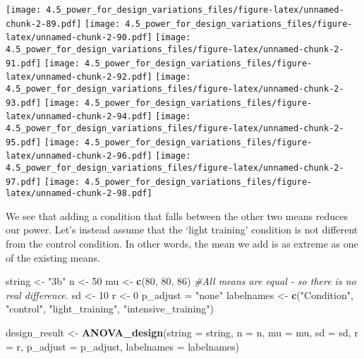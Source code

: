 \documentclass[]{article}
\newenvironment{Shaded}{\begin{snugshade}}{\end{snugshade}}
\newcommand{\KeywordTok}[1]{\textcolor[rgb]{0.13,0.29,0.53}{\textbf{#1}}}
\newcommand{\DataTypeTok}[1]{\textcolor[rgb]{0.13,0.29,0.53}{#1}}
\newcommand{\DecValTok}[1]{\textcolor[rgb]{0.00,0.00,0.81}{#1}}
\newcommand{\StringTok}[1]{\textcolor[rgb]{0.31,0.60,0.02}{#1}}
\newcommand{\CommentTok}[1]{\textcolor[rgb]{0.56,0.35,0.01}{\textit{#1}}}
\newcommand{\NormalTok}[1]{#1}
\begin{document}
\texttt{[image: 4.5\_power\_for\_design\_variations\_files/figure-latex/unnamed-chunk-2-89.pdf]}
\texttt{[image: 4.5\_power\_for\_design\_variations\_files/figure-latex/unnamed-chunk-2-90.pdf]}
\texttt{[image: 4.5\_power\_for\_design\_variations\_files/figure-latex/unnamed-chunk-2-91.pdf]}
\texttt{[image: 4.5\_power\_for\_design\_variations\_files/figure-latex/unnamed-chunk-2-92.pdf]}
\texttt{[image: 4.5\_power\_for\_design\_variations\_files/figure-latex/unnamed-chunk-2-93.pdf]}
\texttt{[image: 4.5\_power\_for\_design\_variations\_files/figure-latex/unnamed-chunk-2-94.pdf]}
\texttt{[image: 4.5\_power\_for\_design\_variations\_files/figure-latex/unnamed-chunk-2-95.pdf]}
\texttt{[image: 4.5\_power\_for\_design\_variations\_files/figure-latex/unnamed-chunk-2-96.pdf]}
\texttt{[image: 4.5\_power\_for\_design\_variations\_files/figure-latex/unnamed-chunk-2-97.pdf]}
\texttt{[image: 4.5\_power\_for\_design\_variations\_files/figure-latex/unnamed-chunk-2-98.pdf]}

We see that adding a condition that falls between the other two means
reduces our power. Let's instead assume that the `light training'
condition is not different from the control condition. In other words,
the mean we add is as extreme as one of the existing means.

\begin{Shaded}
\begin{Highlighting}[]
\NormalTok{string <-}\StringTok{ "3b"}
\NormalTok{n <-}\StringTok{ }\DecValTok{50}
\NormalTok{mu <-}\StringTok{ }\KeywordTok{c}\NormalTok{(}\DecValTok{80}\NormalTok{, }\DecValTok{80}\NormalTok{, }\DecValTok{86}\NormalTok{) }\CommentTok{#All means are equal - so there is no real difference.}
\NormalTok{sd <-}\StringTok{ }\DecValTok{10}
\NormalTok{r <-}\StringTok{ }\DecValTok{0} 
\NormalTok{p_adjust =}\StringTok{ "none"}
\NormalTok{labelnames <-}\StringTok{ }\KeywordTok{c}\NormalTok{(}\StringTok{"Condition"}\NormalTok{, }\StringTok{"control"}\NormalTok{, }\StringTok{"light_training"}\NormalTok{, }\StringTok{"intensive_training"}\NormalTok{) }

\NormalTok{design_result <-}\StringTok{ }\KeywordTok{ANOVA_design}\NormalTok{(}\DataTypeTok{string =}\NormalTok{ string,}
                   \DataTypeTok{n =}\NormalTok{ n, }
                   \DataTypeTok{mu =}\NormalTok{ mu, }
                   \DataTypeTok{sd =}\NormalTok{ sd, }
                   \DataTypeTok{r =}\NormalTok{ r, }
                   \DataTypeTok{p_adjust =}\NormalTok{ p_adjust,}
                   \DataTypeTok{labelnames =}\NormalTok{ labelnames)}
\end{Highlighting}
\end{Shaded}
\end{document}
